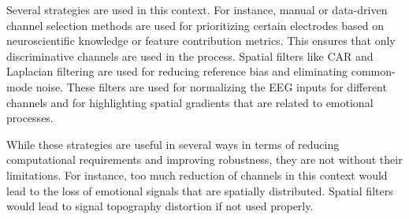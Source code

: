 \documentclass{WileyMSP-template}
\begin{document}
Several strategies are used in this context. For instance, manual or data-driven channel selection methods are used for prioritizing certain electrodes based on neuroscientific knowledge or feature contribution metrics. This ensures that only discriminative channels are used in the process. Spatial filters like CAR and Laplacian filtering are used for reducing reference bias and eliminating common-mode noise. These filters are used for normalizing the EEG inputs for different channels and for highlighting spatial gradients that are related to emotional processes.

While these strategies are useful in several ways in terms of reducing computational requirements and improving robustness, they are not without their limitations. For instance, too much reduction of channels in this context would lead to the loss of emotional signals that are spatially distributed. Spatial filters would lead to signal topography distortion if not used properly.
\end{document}
